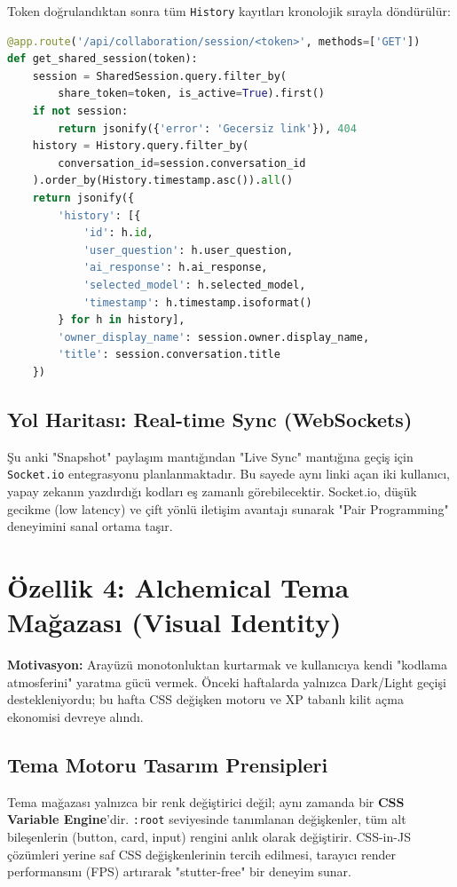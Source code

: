 \documentclass[12pt,a4paper]{article}
\begin{document}
Token doğrulandıktan sonra tüm \texttt{History} kayıtları kronolojik sırayla döndürülür:

\begin{lstlisting}[language=Python, caption=app.py -- get\_shared\_session() (satır 6155--6184)]
@app.route('/api/collaboration/session/<token>', methods=['GET'])
def get_shared_session(token):
    session = SharedSession.query.filter_by(
        share_token=token, is_active=True).first()
    if not session:
        return jsonify({'error': 'Gecersiz link'}), 404
    history = History.query.filter_by(
        conversation_id=session.conversation_id
    ).order_by(History.timestamp.asc()).all()
    return jsonify({
        'history': [{
            'id': h.id,
            'user_question': h.user_question,
            'ai_response': h.ai_response,
            'selected_model': h.selected_model,
            'timestamp': h.timestamp.isoformat()
        } for h in history],
        'owner_display_name': session.owner.display_name,
        'title': session.conversation.title
    })
\end{lstlisting}

\subsection{Yol Haritası: Real-time Sync (WebSockets)}
Şu anki "Snapshot" paylaşım mantığından "Live Sync" mantığına geçiş için \texttt{Socket.io} entegrasyonu planlanmaktadır. Bu sayede aynı linki açan iki kullanıcı, yapay zekanın yazdırdığı kodları eş zamanlı görebilecektir. Socket.io, düşük gecikme (low latency) ve çift yönlü iletişim avantajı sunarak "Pair Programming" deneyimini sanal ortama taşır.

\section{Özellik 4: Alchemical Tema Mağazası (Visual Identity)}

\textbf{Motivasyon:} Arayüzü monotonluktan kurtarmak ve kullanıcıya kendi "kodlama atmosferini" yaratma gücü vermek. Önceki haftalarda yalnızca Dark/Light geçişi destekleniyordu; bu hafta CSS değişken motoru ve XP tabanlı kilit açma ekonomisi devreye alındı.

\subsection{Tema Motoru Tasarım Prensipleri}
Tema mağazası yalnızca bir renk değiştirici değil; aynı zamanda bir \textbf{CSS Variable Engine}'dir. \texttt{:root} seviyesinde tanımlanan değişkenler, tüm alt bileşenlerin (button, card, input) rengini anlık olarak değiştirir. CSS-in-JS çözümleri yerine saf CSS değişkenlerinin tercih edilmesi, tarayıcı render performansını (FPS) artırarak "stutter-free" bir deneyim sunar.
\end{document}
